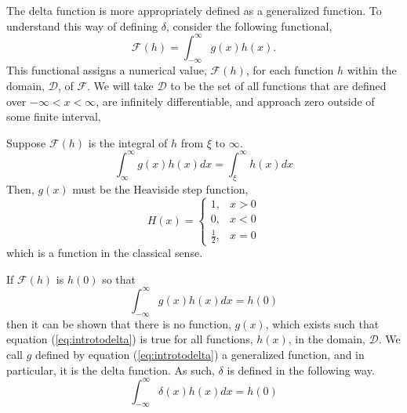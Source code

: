 The delta function is more appropriately defined as a generalized function. To understand this way of defining \(\delta\), consider the following functional,
\begin{equation}
    \mathcal{F}(h) = \int_{-\infty}^{\infty} g(x)h(x).
\end{equation}
This functional assigns a numerical value, \(\mathcal{F}(h)\), for each function \(h\) within the domain, \(\mathcal{D}\), of \(\mathcal{F}\). We will take \(\mathcal{D}\) to be the set of all functions that are defined over \(-\infty <x<\infty\), are infinitely differentiable, and approach zero outside of some finite interval,

Suppose \(\mathcal{F}(h)\) is the integral of \(h\) from \(\xi\) to \(\infty\).
\begin{equation}
    \int_{\infty}^{\infty} g(x)h(x)dx = \int_{\xi}^{\infty} h(x) dx
\end{equation}
Then, \(g(x)\) must be the Heaviside step function,
\begin{equation}
    H(x) = \begin{cases}
        1, & x>0\\
        0, & x<0\\
        \frac{1}{2}, & x=0
    \end{cases}
\end{equation}
which is a function in the classical sense.

If \(\mathcal{F}(h)\) is \(h(0)\) so that
\begin{equation}\label{eq:introtodelta}
    \int_{-\infty}^{\infty}g(x)h(x) dx=h(0)
\end{equation}
then it can be shown that there is no function, \(g(x)\), which exists such that equation (\ref{eq:introtodelta}) is true for all functions, \(h(x)\), in the domain, \(\mathcal{D}\). We call \(g\) defined by equation (\ref{eq:introtodelta}) a generalized function, and in particular, it is the delta function. As such, \(\delta\) is defined in the following way.
\begin{equation}
    \int_{-\infty}^{\infty} \delta(x)h(x) dx = h(0)
\end{equation}


